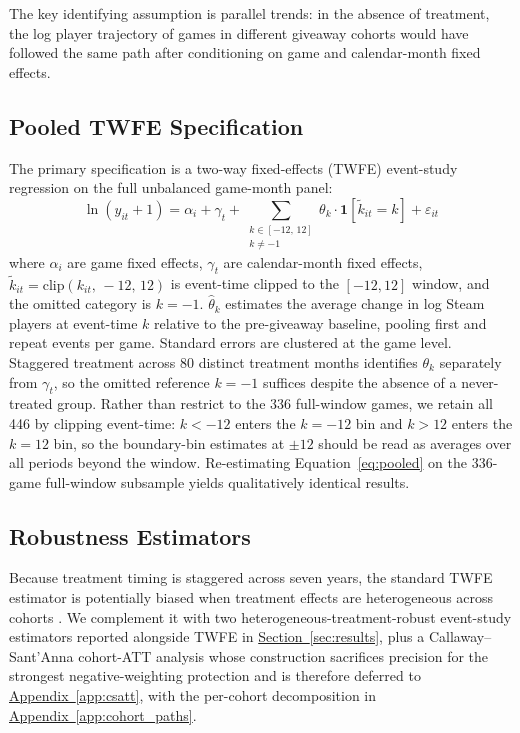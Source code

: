 \documentclass[11pt]{article}
\newcommand{\secref}[1]{\hyperref[#1]{Section~\ref*{#1}}}
\newcommand{\appref}[1]{\hyperref[#1]{Appendix~\ref*{#1}}}
\begin{document}
The key identifying assumption is parallel trends: in the absence of treatment,
the log player trajectory of games in different giveaway cohorts would have
followed the same path after conditioning on game and calendar-month fixed
effects.

\subsection{Pooled TWFE Specification}

The primary specification is a two-way fixed-effects (TWFE) event-study regression on
the full unbalanced game-month panel:
\begin{equation}
\label{eq:pooled}
\ln(y_{it} + 1) = \alpha_i + \gamma_t +
  \sum_{\substack{k \in [-12,\,12] \\ k \neq -1}}
  \theta_k \cdot \mathbf{1}[\tilde{k}_{it} = k]
  + \varepsilon_{it}
\end{equation}
where $\alpha_i$ are game fixed effects, $\gamma_t$ are calendar-month fixed
effects, $\tilde{k}_{it} = \text{clip}(k_{it},\,-12,\,12)$ is event-time
clipped to the $[-12, 12]$ window, and the omitted category is $k = -1$.
$\hat{\theta}_k$ estimates the average change in log Steam players at
event-time $k$ relative to the pre-giveaway baseline, pooling first and repeat
events per game. Standard errors are clustered at the game level. Staggered
treatment across 80 distinct treatment months identifies $\theta_k$ separately
from $\gamma_t$, so the omitted reference $k = -1$ suffices despite the absence
of a never-treated group. Rather than restrict to the 336 full-window games, we
retain all 446 by clipping event-time: $k < -12$ enters the $k = -12$ bin and
$k > 12$ enters the $k = 12$ bin, so the boundary-bin estimates at $\pm 12$
should be read as averages over all periods beyond the window. Re-estimating
Equation~\eqref{eq:pooled} on the 336-game full-window subsample yields
qualitatively identical results.

\subsection{Robustness Estimators}

Because treatment timing is staggered across seven years, the standard TWFE estimator
is potentially biased when treatment effects are heterogeneous across cohorts
\citep{callaway2021}. We complement it with two heterogeneous-treatment-robust
event-study estimators reported alongside TWFE in \secref{sec:results}, plus
a Callaway--Sant'Anna cohort-ATT analysis whose construction sacrifices precision
for the strongest negative-weighting protection and is therefore deferred to
\appref{app:csatt}, with the per-cohort decomposition in
\appref{app:cohort_paths}.
\end{document}
